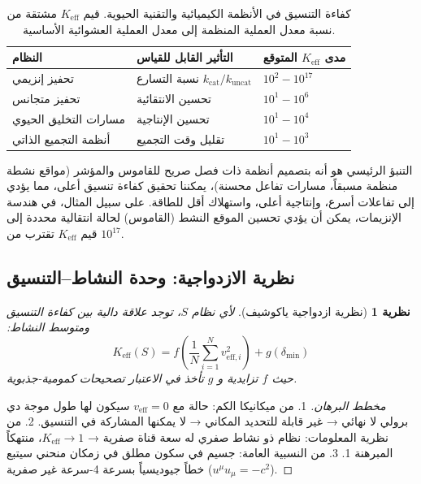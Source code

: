 \documentclass[11pt,a4paper]{article}
\newtheorem{theorem}{نظرية}
\begin{document}
	\begin{table}[htbp]
		\centering
		\small
		\begin{english}
			\begin{tabular}{p{}p{0.35\textwidth}p{}}
				\toprule
				\textbf{النظام} & \textbf{التأثير القابل للقياس} & \textbf{مدى $K_{\mathrm{eff}}$ المتوقع} \\
				\midrule
				تحفيز إنزيمي & نسبة التسارع $k_{\text{cat}}/k_{\text{uncat}}$ & $10^2 - 10^{17}$ \\
				تحفيز متجانس & تحسين الانتقائية & $10^1 - 10^6$ \\
				مسارات التخليق الحيوي & تحسين الإنتاجية & $10^1 - 10^4$ \\
				أنظمة التجميع الذاتي & تقليل وقت التجميع & $10^1 - 10^3$ \\
				\bottomrule
			\end{tabular}
		\end{english}
		\caption{كفاءة التنسيق في الأنظمة الكيميائية والتقنية الحيوية. قيم $K_{\mathrm{eff}}$ مشتقة من نسبة معدل العملية المنظمة إلى معدل العملية العشوائية الأساسية.}
		\label{tab:chemical-keff}
	\end{table}
	
	التنبؤ الرئيسي هو أنه بتصميم أنظمة ذات فصل صريح للقاموس والمؤشر (مواقع نشطة منظمة مسبقاً، مسارات تفاعل محسنة)، يمكننا تحقيق كفاءة تنسيق أعلى، مما يؤدي إلى تفاعلات أسرع، وإنتاجية أعلى، واستهلاك أقل للطاقة. على سبيل المثال، في هندسة الإنزيمات، يمكن أن يؤدي تحسين الموقع النشط (القاموس) لحالة انتقالية محددة إلى قيم $K_{\mathrm{eff}}$ تقترب من $10^{17}$.
	
	\subsection{نظرية الازدواجية: وحدة النشاط–التنسيق}
	
	\begin{theorem}[نظرية ازدواجية ياكوشيف]
		لأي نظام $S$، توجد علاقة دالية بين كفاءة التنسيق ومتوسط النشاط:
		\[
		K_{\mathrm{eff}}(S) = f\left( \frac{1}{N}\sum_{i=1}^N v_{\mathrm{eff},i}^2 \right) + g(\delta_{\min})
		\]
		حيث $f$ تزايدية و $g$ تأخذ في الاعتبار تصحيحات كمومية-جذبوية.
	\end{theorem}
	
	\begin{proof}[مخطط البرهان]
		1. من ميكانيكا الكم: حالة مع $v_{\mathrm{eff}} = 0$ سيكون لها طول موجة دي برولي لا نهائي → غير قابلة للتحديد المكاني → لا يمكنها المشاركة في التنسيق.
		2. من نظرية المعلومات: نظام ذو نشاط صفري له سعة قناة صفرية → $K_{\mathrm{eff}} \to 1$، منتهكاً المبرهنة 1.
		3. من النسبية العامة: جسيم في سكون مطلق في زمكان منحني سيتبع خطاً جيوديسياً بسرعة 4-سرعة غير صفرية ($u^\mu u_\mu = -c^2$).
	\end{proof}
	
\end{document}
